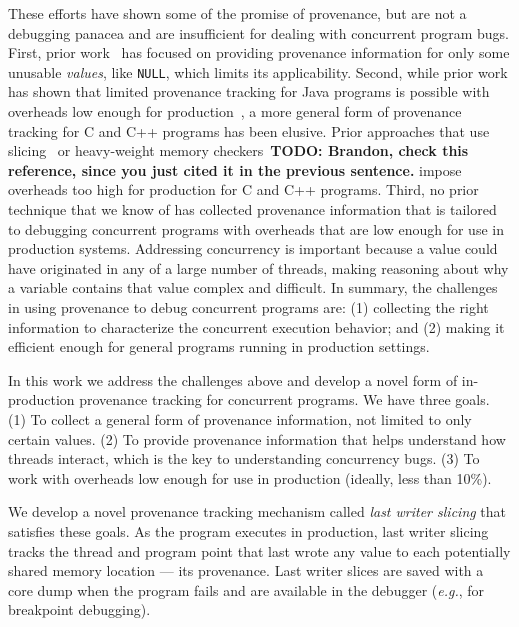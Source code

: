 \documentclass[preprint,9pt]{sigplanconf}
\begin{document}
These efforts have shown some of the promise of provenance, but are not a
debugging panacea and are insufficient for dealing with concurrent program
bugs. First, prior work~\cite{badapples} has focused on providing provenance
information for only some unusable {\em values}, like {\tt NULL}, which limits its applicability. 
Second, while prior work has shown that limited provenance
tracking for Java programs is possible with overheads low enough for
production~\cite{badapples}, a more general form of provenance tracking for C
and C++ programs has been elusive. Prior approaches that use
slicing~\cite{thinslicing, tipslicingsurvey, whylineicse} or heavy-weight
memory checkers~\cite{badapples}{\bf TODO: Brandon, check this reference, since you just cited it in the previous sentence.} impose overheads too high for production for
C and C++ programs. Third, no prior technique that we know of has collected
provenance information that is tailored to debugging concurrent programs with
overheads that are low enough for use in production systems. Addressing
concurrency is important because a value could have originated in any of a
large number of threads, making reasoning about why a variable contains that
value complex and difficult. In summary, the challenges in using provenance to debug concurrent programs are: (1) collecting the right information to characterize the concurrent execution behavior; and (2) making it efficient enough for general programs running in production settings. 

In this work we address the challenges above and develop a novel form of
in-production provenance tracking for concurrent programs. We have three
goals. (1) To collect a general form of provenance information, not limited to
only certain values. (2) To provide provenance information that helps
understand how threads interact, which is the key to understanding concurrency
bugs. (3) To work with overheads low enough for use in production (ideally,
less than 10\%).

We develop a novel provenance tracking mechanism called {\em last writer
slicing} that satisfies these goals.   As the program executes in production,
last writer slicing tracks the thread and program point that last wrote any
value to each potentially shared memory location --- its provenance.  Last
writer slices are saved with a core dump when the program fails and are
available in the debugger ({\em e.g.}, for breakpoint debugging).
\end{document}
